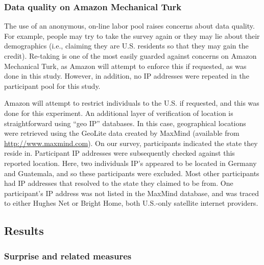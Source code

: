 \subsubsection{Data quality on Amazon Mechanical Turk}
\label{sec:mturk-problems}

The use of an anonymous, on-line labor pool raises concerns about data quality.
For example, people may try to take the survey again or they may lie about their
demographics (i.e., claiming they are U.S. residents so that they may gain the
credit). Re-taking is one of the most easily guarded against concerns on Amazon
Mechanical Turk, as Amazon will attempt to enforce this if requested, as was
done in this study. However, in addition, no IP addresses were repeated in the
participant pool for this study.

Amazon will attempt to restrict individuals to the U.S. if requested, and this
was done for this experiment. An additional layer of verification of location is
straightforward using “geo IP” databases. In this case, geographical locations
were retrieved using the GeoLite data created by MaxMind (available from
\url{http://www.maxmind.com}). On our survey, participants indicated the state
they reside in. Participant IP addresses were subsequently checked against this
reported location. Here, two individuals IP’s appeared to be located in Germany
and Guatemala, and so these participants were excluded. Most other
participants had IP addresses that resolved to the state they claimed to be
from. One participant’s IP address was not listed in the MaxMind database, and
was traced to either Hughes Net or Bright Home, both U.S.-only satellite
internet providers.

\subsection{Results}

\subsubsection{Surprise and related measures}

